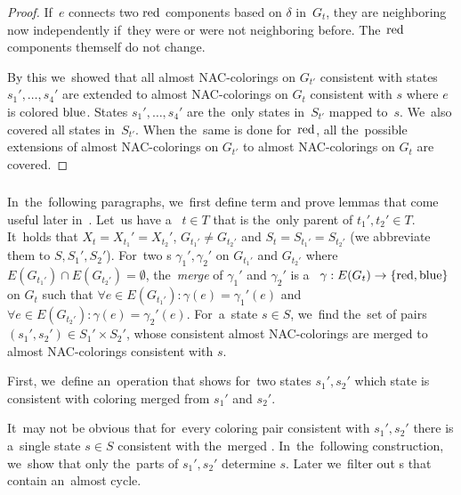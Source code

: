 \begin{proof}
	If~\( e \) connects two \( \text{red} \) components based on \( \delta \) in~\( G_t \),
	they are neighboring now independently if~they were or were not neighboring before.
	The~\( \text{red} \) components themself do not change.

	By this we~showed that all almost NAC-colorings on \( G_{t'} \) consistent with
	states \( s_1', \dots, s_4' \) are extended to almost NAC-colorings on \( G_t \)
	consistent with \( s \) where \( e \) is colored \( \text{blue} \).
	States \( s_1', \dots, s_4' \) are the~only states in~\( S_{t'} \) mapped to~\( s \).
	We~also covered all states in~\( S_{t'} \).
	When the~same is done for~\( \text{red} \), all the~possible extensions
	of almost NAC-colorings on \( G_{t'} \) to almost NAC-colorings on \( G_t \)
	are covered.
\end{proof}

\subsubsection*{\JoinNode{}}

In~the~following paragraphs,
we~first define term and prove lemmas
that come useful later in~.
%
Let~us have a~\JoinNode{} \( t \in T \) that is
the~only parent of \( t_1', t_2' \in T \).
It~holds that \( X_t = X_{t_1}' = X_{t_2}' \),
\( G_{t_1'} \ne G_{t_2'} \)
and \( S_t = S_{t_1'} = S_{t_2'} \)
(we abbreviate them to \( S, S_1', S_2' \)).
%
For~two \rbcol{}s \( \gamma_1', \gamma_2' \)
on \( G_{t_1'} \) and \( G_{t_2'} \)
where \( E(G_{t_1'}) \cap E(G_{t_2'}) = \emptyset \),
the~\emph{merge} of \( \gamma_1' \) and \( \gamma_2' \)
is a~\rbcol{} \( \gamma : E(G_t) \to \{ \text{red}, \text{blue} \} \) on \( G_t \)
such that \( \forall e \in E(G_{t_1'}) : \gamma(e) = \gamma_1'(e) \) and
\( \forall e \in E(G_{t_2'}) : \gamma(e) = \gamma_2'(e) \).
%
For~a~state \( s \in S \), we~find the~set of
pairs \( (s_1', s_2') \in S_1' \times S_2' \),
whose consistent almost NAC-colorings are merged
to almost NAC-colorings consistent with \( s \).

First, we~define an~operation that shows for~two states \( s_1', s_2' \)
which state is consistent with coloring merged from \( s_1' \) and \( s_2' \).
%
%
It~may not be obvious that for~every coloring pair consistent with \( s_1', s_2' \)
there is a~single state \( s \in S \) consistent with the~merged \rbcol{}.
In~the~following construction, we~show that
only the~parts of \( s_1', s_2' \) determine \( s \).
Later we~filter out \rbcol{}s that contain an~almost cycle.

